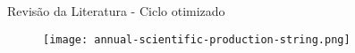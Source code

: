 \begin{frame}[c]{Revisão da Literatura - Ciclo otimizado}
    \begin{figure}
        \texttt{[image: annual-scientific-production-string.png]}
    \end{figure}
\end{frame}
